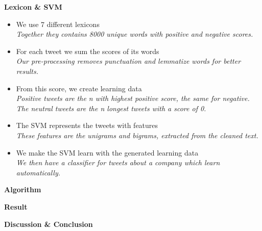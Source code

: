 \documentclass[landscape,20pt]{extarticle}
\newcommand*{\TitleFont}{\Huge \bf}
\newcommand*{\TextFont}{\normalsize \it}
\begin{document}
\clearpage
\thispagestyle{empty}

{\TitleFont Lexicon \& SVM}

\begin{itemize}
\item We use 7 different lexicons\\
{\TextFont Together they contains 8000 unique words with positive and negative scores.}
\item For each tweet we sum the scores of its words\\
{\TextFont Our pre-processing removes punctuation and lemmatize words for better results.}
\item From this score, we create learning data\\
{\TextFont Positive tweets are the \textit{n} with highest positive score, the same for negative.\\
The neutral tweets are the \textit{n} longest tweets with a score of 0.}
\item The SVM represents the tweets with features\\
{\TextFont These features are the unigrams and bigrams, extracted from the cleaned text.}
\item We make the SVM learn with the generated learning data\\
{\TextFont We then have a classifier for tweets about a company which learn automatically.}
\end{itemize}

\clearpage
\thispagestyle{empty}

{\TitleFont Algorithm}

\clearpage
\thispagestyle{empty}

{\TitleFont Result}

\clearpage
\thispagestyle{empty}

{\TitleFont Discussion \& Conclusion}
\end{document}

